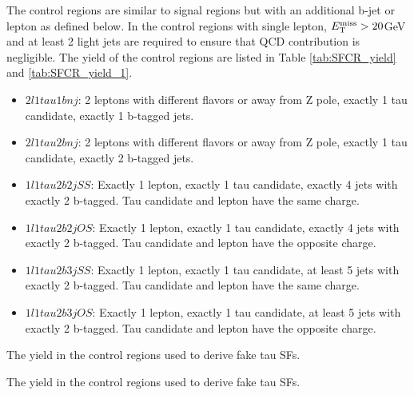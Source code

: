The control regions are similar to signal regions but with an additional b-jet or lepton as defined below. In the control regions with single lepton, $E_{\text{T}}^{\text{miss}} > 20$GeV and at least 2 light jets are required to ensure that QCD contribution is negligible. The yield of the control regions are listed in Table \ref{tab:SFCR_yield} and \ref{tab:SFCR_yield_1}.

\begin{itemize}
\item{$2l1tau1bnj$: 2 leptons with different flavors or away from Z pole, exactly 1 tau candidate,  exactly 1 b-tagged jets.}
\item{$2l1tau2bnj$: 2 leptons with different flavors or away from Z pole, exactly 1 tau candidate,  exactly 2 b-tagged jets.}
\item{$1l1tau2b2j SS$: Exactly 1 lepton, exactly 1 tau candidate, exactly 4 jets with exactly 2 b-tagged. Tau candidate and lepton have the same charge.}
\item{$1l1tau2b2j OS$: Exactly 1 lepton, exactly 1 tau candidate, exactly 4 jets with exactly 2 b-tagged. Tau candidate and lepton have the opposite charge.}
\item{$1l1tau2b3j SS$: Exactly 1 lepton, exactly 1 tau candidate, at least 5 jets with exactly 2 b-tagged. Tau candidate and lepton have the same charge.}
\item{$1l1tau2b3j OS$: Exactly 1 lepton, exactly 1 tau candidate, at least 5 jets with exactly 2 b-tagged. Tau candidate and lepton have the opposite charge.}
\end{itemize}


\begin{table}
\caption{The yield in the control regions used to derive fake tau SFs.}
\label{tab:SFCR_yield}

\end{table}
\begin{table}
\caption{The yield in the control regions used to derive fake tau SFs.}
\label{tab:SFCR_yield_1}

\end{table}

